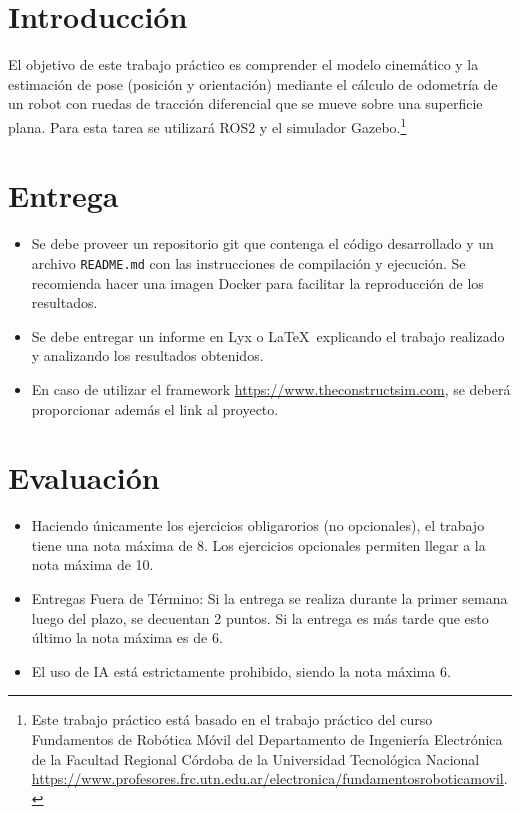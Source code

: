 \documentclass[tp]{lcc}
\begin{document}
\maketitle


\section{Introducción}

El objetivo de este trabajo práctico es comprender el modelo cinemático y la estimación de pose (posición y orientación) mediante el cálculo de odometría de un robot con ruedas de tracción diferencial que se mueve sobre una superficie plana. Para esta tarea se utilizará ROS2 y el simulador Gazebo.\footnote{Este trabajo práctico está basado en el trabajo práctico del curso Fundamentos de Robótica Móvil del Departamento de Ingeniería Electrónica de la Facultad Regional Córdoba de la Universidad Tecnológica Nacional \url{https://www.profesores.frc.utn.edu.ar/electronica/fundamentosroboticamovil}.}


\section{Entrega}
\begin{itemize}
    \item Se debe proveer un repositorio git que contenga el código desarrollado y un archivo \lstinline{README.md} con las instrucciones de compilación y ejecución. Se recomienda hacer una imagen Docker para facilitar la reproducción de los resultados.

    \item Se debe entregar un informe en Lyx o \LaTeX\  explicando el trabajo realizado y analizando los resultados obtenidos.
    
    \item En caso de utilizar el framework \url{https://www.theconstructsim.com}, se deberá proporcionar además el link al proyecto.
\end{itemize}

\section{Evaluación}
\begin{itemize}
    \item Haciendo únicamente los ejercicios obligarorios (no opcionales), el trabajo tiene una nota máxima de 8. Los ejercicios opcionales permiten llegar a la nota máxima de 10.

    \item Entregas Fuera de Término: Si la entrega se realiza durante la primer semana luego del plazo, se decuentan 2 puntos. Si la entrega es más tarde que esto último la nota máxima es de 6.
    
    \item El uso de IA está estrictamente prohibido, siendo la nota máxima 6.
\end{itemize}
\end{document}
